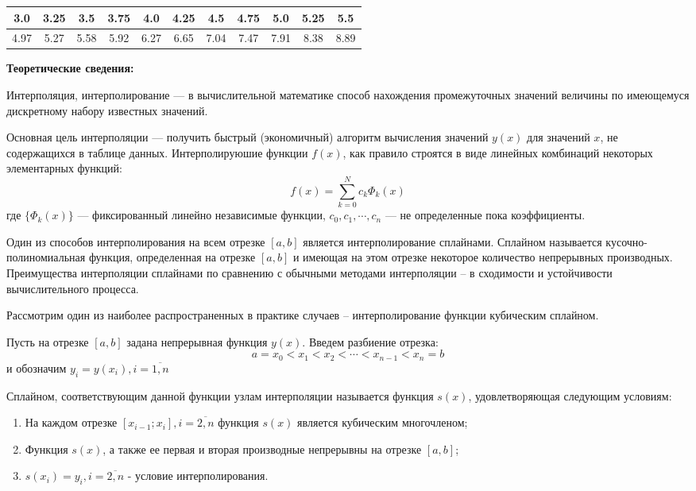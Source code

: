 \documentclass [12pt]{article}
\begin{document}
\begin{table}[h]
\begin{center}
\begin{tabular}{|c|c|c|c|c|c|c|c|c|c|c|}
\hline
3.0 & 3.25 & 3.5 & 3.75 & 4.0 & 4.25 & 4.5 & 4.75 & 5.0 & 5.25 & 5.5 \\
\hline
4.97 & 5.27 & 5.58 & 5.92 & 6.27 & 6.65 & 7.04 & 7.47 & 7.91 & 8.38 & 8.89 \\
\hline
\end{tabular}
\end{center}
\end{table}

\textbf{Теоретические сведения:}

Интерполяция, интерполирование — в вычислительной математике способ нахождения промежуточных значений величины по имеющемуся дискретному набору известных значений.

Основная цель интерполяции — получить быстрый (экономичный) алгоритм вычисления значений $y(x)$ для значений $x$, не содержащихся в таблице данных.
Интерполируюшие функции $f(x)$, как правило строятся в виде линейных комбинаций некоторых элементарных функций:
$$f(x)=\sum_{k=0}^N {c_k\Phi_k(x)}$$
где $\{\Phi_k(x)\}$ — фиксированный линейно независимые функции, $c_0, c_1, \cdots, c_n$ — не определенные пока коэффициенты.

Один из способов интерполирования на всем отрезке $[a, b]$ является интерполирование сплайнами.
Сплайном называется кусочно-полиномиальная функция, определенная на отрезке $[a, b]$ и имеющая на этом отрезке некоторое количество непрерывных производных. Преимущества интерполяции сплайнами по сравнению с обычными методами интерполяции – в сходимости и устойчивости вычислительного процесса.

Рассмотрим один из наиболее распространенных в практике случаев – интерполирование функции кубическим сплайном.

Пусть на отрезке $[a, b]$ задана непрерывная функция $y(x)$. Введем разбиение отрезка:
$$ a = x_0 < x_1 < x_2 < \cdots < x_{n-1} < x_n = b $$ и обозначим $y_i=y(x_i),  i = \overline{1,n}$

Сплайном, соответствующим данной функции узлам интерполяции называется функция $s(x)$, удовлетворяющая следующим условиям:
\begin{enumerate}
\item На каждом отрезке $[x_{i-1};x_{i}],  i = \overline{2,n}$ функция $s(x)$ является кубическим многочленом;
\item Функция $s(x)$, а также ее первая и вторая производные непрерывны на отрезке $[a, b]$;
\item $s(x_i)=y_i,  i = \overline{2,n}$ - условие интерполирования.
\end{enumerate}
\end{document}
